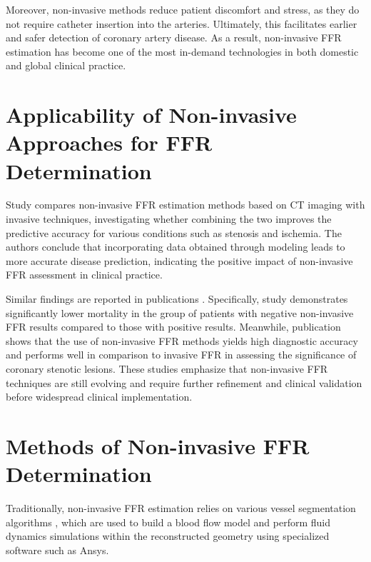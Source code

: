 \documentclass[default]{subfiles}
\begin{document}
Moreover, non-invasive methods reduce patient discomfort and stress, as they do not require catheter insertion into the
arteries. Ultimately, this facilitates earlier and safer detection of coronary artery disease. As a result,
non-invasive FFR estimation has become one of the most in-demand technologies in both domestic and global clinical
practice.

\section{Applicability of Non-invasive Approaches for FFR Determination}

Study \cite{lu2017ffr} compares non-invasive FFR estimation methods based on CT imaging with invasive techniques,
investigating whether combining the two improves the predictive accuracy for various conditions such as stenosis and
ischemia. The authors conclude that incorporating data obtained through modeling leads to more accurate disease
prediction, indicating the positive impact of non-invasive FFR assessment in clinical practice.

Similar findings are reported in publications \cite{patel2020advance, villines2020advance, norgaard2019ctffr,
agasthi2018meta, douglas_2009, vanrosendael_2020, jonas_2025, jensen_2012}. Specifically, study
\cite{patel2020advance} demonstrates significantly lower mortality in the group of patients with negative non-invasive
FFR results compared to those with positive results. Meanwhile, publication \cite{agasthi2018meta, rao_2023} shows that
the use of non-invasive FFR methods yields high diagnostic accuracy and performs well in comparison to invasive FFR in
assessing the significance of coronary stenotic lesions. These studies emphasize that non-invasive FFR techniques are
still evolving and require further refinement and clinical validation before widespread clinical implementation.

\section{Methods of Non-invasive FFR Determination}

Traditionally, non-invasive FFR estimation relies on various vessel segmentation algorithms \cite{pal1993segmentation},
which are used to build a blood flow model and perform fluid dynamics simulations within the reconstructed geometry
using specialized software such as Ansys.
\end{document}

